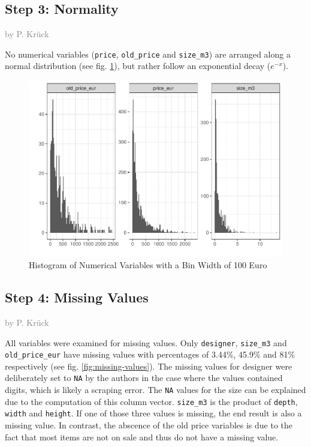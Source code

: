 \documentclass[a4paper, nobind]{templates/ociamthesis}
\begin{document}
\hypertarget{step-3-normality}{%
\subsection{Step 3: Normality}\label{step-3-normality}}

\textcolor{gray}{by P. Krück}

No numerical variables (\texttt{price}, \texttt{old\_price} and \texttt{size\_m3}) are arranged along a normal distribution (see fig. \ref{fig:normality}), but rather follow an exponential decay (\(e^{-x}\)).

\begin{figure}
\includegraphics[width=1\linewidth]{_main_files/figure-latex/normality-1} \caption{Histogram of Numerical Variables with a Bin Width of 100 Euro}\label{fig:normality}
\end{figure}

\hypertarget{missing-values}{%
\subsection{Step 4: Missing Values}\label{missing-values}}

\textcolor{gray}{by P. Krück}

All variables were examined for missing values. Only \texttt{designer}, \texttt{size\_m3} and \texttt{old\_price\_eur} have missing values with percentages of 3.44\%, 45.9\% and 81\% respectively (see fig. \ref{fig:missing-values}).
The missing values for designer were deliberately set to \texttt{NA} by the authors in the case where the values contained digits, which is likely a scraping error.
The \texttt{NA} values for the size can be explained due to the computation of this column vector. \texttt{size\_m3} is the product of \texttt{depth}, \texttt{width} and \texttt{height}. If one of those three values is missing, the end result is also a missing value.
In contrast, the abscence of the old price variables is due to the fact that most items are not on sale and thus do not have a missing value.
\end{document}
